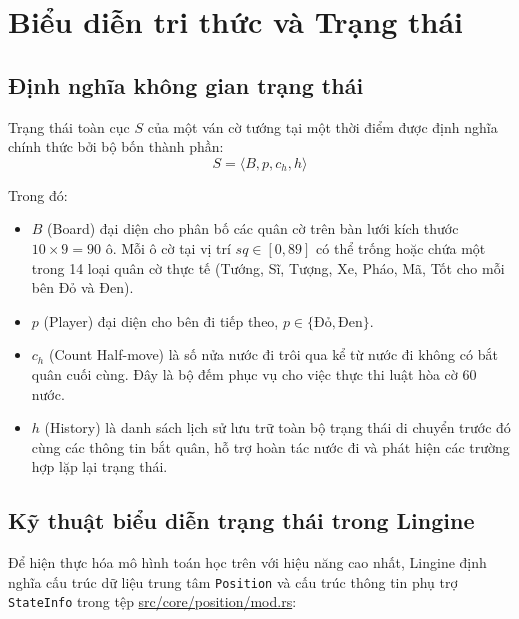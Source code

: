 \chapter{Biểu diễn tri thức và Trạng thái}

\section{Định nghĩa không gian trạng thái}

Trạng thái toàn cục $S$ của một ván cờ tướng tại một thời điểm được định nghĩa chính thức bởi bộ bốn thành phần:
\[ S = \langle B, p, c_h, h \rangle \]

Trong đó:
\begin{itemize}
    \item $B$ (Board) đại diện cho phân bố các quân cờ trên bàn lưới kích thước $10 \times 9 = 90$ ô. Mỗi ô cờ tại vị trí $sq \in [0, 89]$ có thể trống hoặc chứa một trong 14 loại quân cờ thực tế (Tướng, Sĩ, Tượng, Xe, Pháo, Mã, Tốt cho mỗi bên Đỏ và Đen).
    \item $p$ (Player) đại diện cho bên đi tiếp theo, $p \in \{\text{Đỏ}, \text{Đen}\}$.
    \item $c_h$ (Count Half-move) là số nửa nước đi trôi qua kể từ nước đi không có bắt quân cuối cùng. Đây là bộ đếm phục vụ cho việc thực thi luật hòa cờ 60 nước.
    \item $h$ (History) là danh sách lịch sử lưu trữ toàn bộ trạng thái di chuyển trước đó cùng các thông tin bắt quân, hỗ trợ hoàn tác nước đi và phát hiện các trường hợp lặp lại trạng thái.
\end{itemize}

\section{Kỹ thuật biểu diễn trạng thái trong Lingine}

Để hiện thực hóa mô hình toán học trên với hiệu năng cao nhất, Lingine định nghĩa cấu trúc dữ liệu trung tâm \texttt{Position} và cấu trúc thông tin phụ trợ \texttt{StateInfo} trong tệp \url{src/core/position/mod.rs}:

